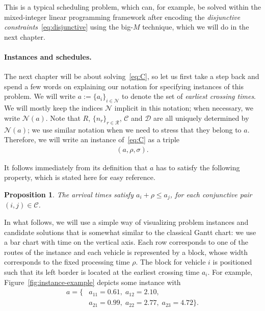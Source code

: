 \documentclass{report}
\theoremstyle{definition}
\theoremstyle{plain}
\newtheorem{proposition}{Proposition}[chapter]
\begin{document}
This is a typical scheduling problem, which can, for example, be solved within
the mixed-integer linear programming framework after encoding the \textit{disjunctive
  constraints}~\eqref{eq:disjunctive} using the big-$M$ technique, which we will do in
the next chapter.


\paragraph{Instances and schedules.}

The next chapter will be about solving~\eqref{eq:C}, so let us first take a step back and
spend a few words on explaining our notation for specifying instances
of this problem.
%
We will write $a := \{ a_i \}_{i \in \mathcal{N} }$ to denote the set of
\emph{earliest crossing times}.
%
We will mostly keep the indices $\mathcal{N}$ implicit in this notation; when
necessary, we write $\mathcal{N}(a)$.
%
Note that $R$, $\{n_r\}_{r \in \mathcal{R}}$, $\mathcal{C}$ and $\mathcal{D}$
are all uniquely determined by $\mathcal{N}(a)$; we use similar notation when we
need to stress that they belong to $a$.
%
Therefore, we will write an instance of~\eqref{eq:C} as a triple
%
\begin{align*}
  (a, \rho, \sigma) .
\end{align*}

It follows immediately from its definition that $a$ has to satisfy the following
property, which is stated here for easy reference.

\begin{proposition}\label{lemma:arrivals}
  The arrival times satisfy $a_i + \rho \leq a_j$, for each conjunctive pair $(i, j) \in \mathcal{C}$.
\end{proposition}


In what follows, we will use a simple way of visualizing
problem instances and candidate solutions that is somewhat similar to the
classical Gantt chart: we use a bar chart with time on the vertical axis.
%
Each row corresponds to one of the routes of the instance and each vehicle
is represented by a block, whose width corresponds to the fixed processing
time $\rho$.
%
The block for vehicle $i$ is positioned such that its 
left border is located at the earliest crossing time $a_i$.
%
For example, Figure~\ref{fig:instance-example} depicts some instance with
\begin{align*}
  a = \{&a_{11} = 0.61, \; a_{12} = 2.10, \\
        &a_{21} = 0.99, \; a_{22} = 2.77, \; a_{23} = 4.72 \} .
\end{align*}
\end{document}
